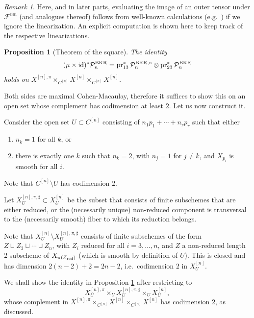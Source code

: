 \documentclass{amsart}
\theoremstyle{plain}
\newtheorem{proposition}[theorem]{Proposition}
\theoremstyle{definition}
\theoremstyle{remark}
\newtheorem{remark}[theorem]{Remark}
\begin{document}
    \begin{remark}
        Here, and in later parts, evaluating the image of an outer tensor under $\mathcal F^{\boxtimes n}$ (and analogues thereof) follows from well-known calculations (e.g.~\cite[Exercise 5.13]{HuyFM}) if we ignore the linearization.
        An explicit computation is shown here to keep track of the respective linearizations.
    \end{remark}
    \begin{proposition}[Theorem of the square]\label{tots}
        The identity
        \[(\mu\times\operatorname{id})^\ast\mathcal P^{\rm BKR}_n=\operatorname{pr}_{13}^\ast\mathcal P^{\rm BKR,\circ}_n\otimes\operatorname{pr}_{23}^\ast\mathcal P^{\rm BKR}_n\]
        holds on $X^{[n],\pi}\times_{C^{[n]}}X^{[n]}\times_{C^{[n]}}X^{[n]}$.
    \end{proposition}
    Both sides are maximal Cohen-Macaulay, therefore it suffices to show this on an open set whose complement has codimension at least $2$.
    Let us now construct it.

    Consider the open set $U\subset C^{[n]}$ consisting of $n_1p_1+\cdots+n_rp_r$ such that either
    \begin{enumerate}
        \item $n_k=1$ for all $k$, or
        \item there is exactly one $k$ such that $n_k=2$, with $n_j=1$ for $j\neq k$, and $X_{p_i}$ is smooth for all $i$.
    \end{enumerate}
    Note that $C^{[n]}\setminus U$ has codimension $2$.

    Let $X^{[n],\pi,\sharp}_U\subset X_U^{[n]}$ be the subset that consists of finite subschemes that are either reduced, or the (necessarily unique) non-reduced component is transversal to the (necessarily smooth) fiber to which its reduction belongs.

    Note that $X_U^{[n]}\setminus X_U^{[n],\pi,\sharp}$ consists of finite subschemes of the form $Z\sqcup Z_3\sqcup\cdots\sqcup Z_n$, with $Z_i$ reduced for all $i=3,\ldots,n$, and $Z$ a non-reduced length $2$ subscheme of $X_{\pi(Z_{\rm red})}$ (which is smooth by definition of $U$).
    This is closed and has dimension $2(n-2)+2=2n-2$, i.e.~codimension $2$ in $X_U^{[n]}$.

    We shall show the identity in Proposition \ref{tots} after restricting to
    \[X^{[n],\pi}_U\times_UX^{[n],\pi,\sharp}_U\times_UX^{[n]}_U,\]
    whose complement in $X^{[n],\pi}\times_{C^{[n]}}X^{[n]}\times_{C^{[n]}}X^{[n]}$ has codimension $2$, as discussed.
\end{document}
